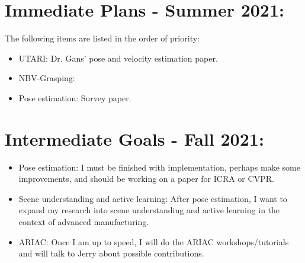 \documentclass[11pt]{article}
\begin{document}

\section{Immediate Plans - Summer 2021:}
The following items are listed in the order of priority:

\begin{itemize}
      \item UTARI: Dr. Gans' pose and velocity estimation paper.
      \item NBV-Grasping:
      \item Pose estimation: Survey paper.
\end{itemize}

\section{Intermediate Goals - Fall 2021:}
\begin{itemize}
      \item Pose estimation: I must be finished with implementation, perhaps make some improvements, and should be working on a paper for ICRA or CVPR.
      \item Scene understanding and active learning: After pose estimation, I want to expand my research into scene understanding and active learning in the context of advanced manufacturing.
      \item ARIAC: Once I am up to speed, I will do the ARIAC workshops/tutorials and will talk to Jerry about possible contributions.
\end{itemize}


\newpage


\end{document}
